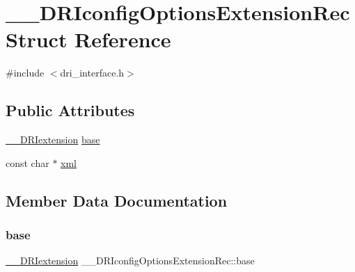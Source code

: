 \hypertarget{struct_____d_r_iconfig_options_extension_rec}{}\section{\+\_\+\+\_\+\+D\+R\+Iconfig\+Options\+Extension\+Rec Struct Reference}
\label{struct_____d_r_iconfig_options_extension_rec}


{\ttfamily \#include $<$dri\+\_\+interface.\+h$>$}

\subsection*{Public Attributes}
\begin{DoxyCompactItemize}
\item 
\hyperlink{dri__interface_8h_a4e0a61c8ece00d2b2c6792a9a1b55385}{\+\_\+\+\_\+\+D\+R\+Iextension} \hyperlink{struct_____d_r_iconfig_options_extension_rec_ac106ec89e0aafef8192efe868b4148b3}{base}
\item 
const char $\ast$ \hyperlink{struct_____d_r_iconfig_options_extension_rec_a39dd7b810d9176fa83584f948b825e40}{xml}
\end{DoxyCompactItemize}


\subsection{Member Data Documentation}
\mbox{\label{struct_____d_r_iconfig_options_extension_rec_ac106ec89e0aafef8192efe868b4148b3}} 
\subsubsection{\texorpdfstring{base}{base}}
{\footnotesize\ttfamily \hyperlink{dri__interface_8h_a4e0a61c8ece00d2b2c6792a9a1b55385}{\+\_\+\+\_\+\+D\+R\+Iextension} \+\_\+\+\_\+\+D\+R\+Iconfig\+Options\+Extension\+Rec\+::base}

\mbox{\label{struct_____d_r_iconfig_options_extension_rec_a39dd7b810d9176fa83584f948b825e40}} 
